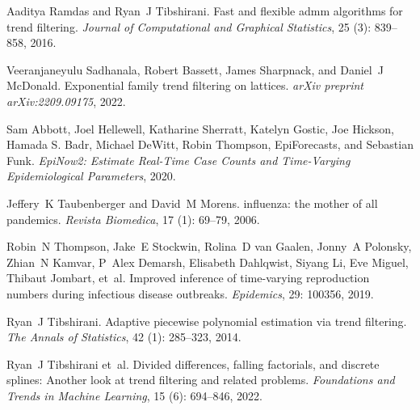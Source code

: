 \documentclass[10pt,letterpaper]{article}
\begin{document}
\begin{thebibliography}{27}
  Aaditya Ramdas and Ryan~J Tibshirani.
  \newblock Fast and flexible admm algorithms for trend filtering.
  \newblock \emph{Journal of Computational and Graphical Statistics}, 25
    (3): 839--858, 2016.
  
  Veeranjaneyulu Sadhanala, Robert Bassett, James Sharpnack, and Daniel~J
    McDonald.
  \newblock Exponential family trend filtering on lattices.
  \newblock \emph{arXiv preprint arXiv:2209.09175}, 2022.
  
  {Sam Abbott}, {Joel Hellewell}, {Katharine Sherratt}, {Katelyn Gostic}, {Joe
    Hickson}, {Hamada S. Badr}, {Michael DeWitt}, {Robin Thompson},
    {EpiForecasts}, and {Sebastian Funk}.
  \newblock \emph{EpiNow2: Estimate Real-Time Case Counts and Time-Varying
    Epidemiological Parameters}, 2020.
  
  Jeffery~K Taubenberger and David~M Morens.
   influenza: the mother of all pandemics.
  \newblock \emph{Revista Biomedica}, 17 (1): 69--79, 2006.
  
  Robin~N Thompson, Jake~E Stockwin, Rolina~D van Gaalen, Jonny~A Polonsky,
    Zhian~N Kamvar, P~Alex Demarsh, Elisabeth Dahlqwist, Siyang Li, Eve Miguel,
    Thibaut Jombart, et~al.
  \newblock Improved inference of time-varying reproduction numbers during
    infectious disease outbreaks.
  \newblock \emph{Epidemics}, 29: 100356, 2019.
  
  Ryan~J Tibshirani.
  \newblock Adaptive piecewise polynomial estimation via trend filtering.
  \newblock \emph{The Annals of Statistics}, 42 (1): 285--323,
    2014.
  
  Ryan~J Tibshirani et~al.
  \newblock Divided differences, falling factorials, and discrete splines:
    Another look at trend filtering and related problems.
  \newblock \emph{Foundations and Trends{\textregistered} in Machine Learning},
    15 (6): 694--846, 2022.
  

\end{thebibliography}
\end{document}
